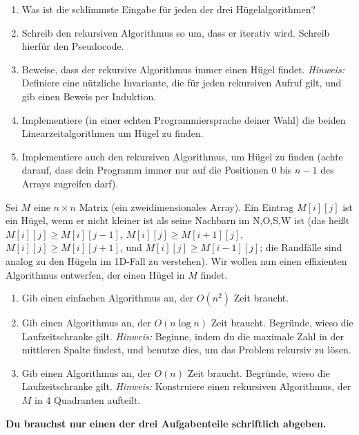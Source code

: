 \documentclass{uebung_cs}
\begin{document}
\begin{aufgabe}\label{thu-last}\mbox{}
	\begin{enumerate}
		\item Was ist die schlimmste Eingabe für jeden der drei Hügelalgorithmen?
		\item Schreib den rekursiven Algorithmus so um, dass er iterativ wird. Schreib hierfür den Pseudocode.
		\item Beweise, dass der rekursive Algorithmus immer einen Hügel findet. \emph{Hinweis:} Definiere eine nützliche Invariante, die für jeden rekursiven Aufruf gilt, und gib einen Beweis per Induktion.
		\item Implementiere (in einer echten Programmiersprache deiner Wahl) die beiden Linearzeitalgorithmen um Hügel zu finden.
		\item Implementiere auch den rekursiven Algorithmus, um Hügel zu finden (achte darauf, dass dein Programm immer nur auf die Positionen $0$ bis $n-1$ des Arrays zugreifen darf).
	\end{enumerate}
\end{aufgabe}

\begin{aufgabe}
	Sei $M$ eine $n\times n$ Matrix (ein zweidimensionales Array).
	Ein Eintrag $M[i][j]$ ist ein Hügel, wenn er nicht kleiner ist als seine Nachbarn im N,O,S,W ist (das heißt $M[i][j]\ge M[i][j-1]$, $M[i][j]\ge M[i+1][j]$, $M[i][j]\ge M[i][j+1]$, und $M[i][j]\ge M[i-1][j]$; die Randfälle sind analog zu den Hügeln im 1D-Fall zu verstehen).
	Wir wollen nun einen effizienten Algorithmus entwerfen, der einen Hügel in $M$ findet.
	\begin{enumerate}
		\item \bestehen Gib einen einfachen Algorithmus an, der $O(n^2)$ Zeit braucht.
		\item \mittel Gib einen Algorithmus an, der $O(n \log n)$ Zeit braucht. Begründe, wieso die Laufzeitschranke gilt. \emph{Hinweis:} Beginne, indem du die maximale Zahl in der mittleren Spalte findest, und benutze dies, um das Problem rekursiv zu lösen.
		\item \note Gib einen Algorithmus an, der $O(n)$ Zeit braucht. Begründe, wieso die Laufzeitschranke gilt. \emph{Hinweis:} Konstruiere einen rekursiven Algorithmus, der $M$ in 4 Quadranten aufteilt.
	\end{enumerate}
	\textbf{Du brauchst nur einen der drei Aufgabenteile schriftlich abgeben.}
\end{aufgabe}
\end{document}
